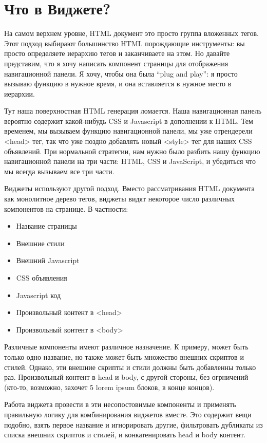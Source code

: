 \section{Что в Виджете?}

На самом верхнем уровне, HTML документ это просто группа вложенных тегов. Этот подход выбирают большинство HTML порождающие инструменты: вы просто определяете иерархию тегов и заканчиваете на этом. Но давайте представим, что я хочу написать компонент страницы для отображения навигационной панели. Я хочу, чтобы она была \textquotedblleft plug and play\textquotedblright : я просто вызываю функцию в нужное время, и она вставляется в нужное место в иерархии.

Тут наша поверхностная HTML генерация ломается. Наша навигационная панель вероятно содержит какой-нибудь CSS и Javascript в дополнении к HTML. Тем временем, мы вызываем функцию навигационной панели, мы уже отрендерели <head> тег, так что уже поздно добавлять новый <style> тег для наших CSS объявлений. При нормальной стратегии, нам нужно было разбить нашу функцию навигационной панели на три части: HTML, CSS и JavaScript, и убедиться что мы всегда вызываем все три части.

Виджеты используют другой подход. Вместо рассматривания HTML документа как монолитное дерево тегов, виджеты видят некоторое число различных компонентов на странице. В частности:

\begin{itemize}
  \item Название страницы
  \item Внешние стили
  \item Внешний Javascript
  \item CSS объявления
  \item Javascript код
  \item Произвольный контент в <head>
  \item Произвольный контент в <body>
\end{itemize}

Различные компоненты имеют различное назначение. К примеру, может быть только одно название, но также может быть множество внешних скриптов и стилей. Однако, эти внешние скрипты и стили должны быть добавленны только раз. Произвольный контент в head и body, с другой стороны, без огрничений (кто-то, возможно, захочет 5 lorem ipsum блоков, в конце концов).

Работа виджета провести в эти несопостовимые компоненты и применять правильную логику для комбинирования виджетов вместе. Это содержит вещи подобно, взять первое название и игнорировать другие, фильтровать дубликаты из списка внешних скриптов и стилей, и конкатенировать head и body контент. %


